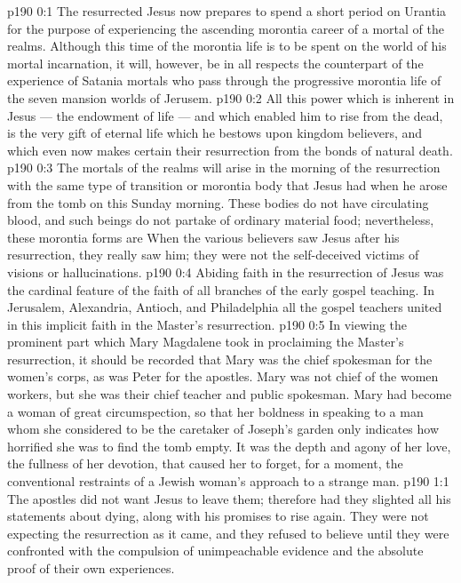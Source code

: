 \author{Midwayer Commission}
\vs p190 0:1 The resurrected Jesus now prepares to spend a short period on Urantia for the purpose of experiencing the ascending morontia career of a mortal of the realms. Although this time of the morontia life is to be spent on the world of his mortal incarnation, it will, however, be in all respects the counterpart of the experience of Satania mortals who pass through the progressive morontia life of the seven mansion worlds of Jerusem.
\vs p190 0:2 All this power which is inherent in Jesus --- the endowment of life --- and which enabled him to rise from the dead, is the very gift of eternal life which he bestows upon kingdom believers, and which even now makes certain their resurrection from the bonds of natural death.
\vs p190 0:3 The mortals of the realms will arise in the morning of the resurrection with the same type of transition or morontia body that Jesus had when he arose from the tomb on this Sunday morning. These bodies do not have circulating blood, and such beings do not partake of ordinary material food; nevertheless, these morontia forms are  When the various believers saw Jesus after his resurrection, they really saw him; they were not the self\hyp{}deceived victims of visions or hallucinations.
\vs p190 0:4 Abiding faith in the resurrection of Jesus was the cardinal feature of the faith of all branches of the early gospel teaching. In Jerusalem, Alexandria, Antioch, and Philadelphia all the gospel teachers united in this implicit faith in the Master’s resurrection.
\vs p190 0:5 \pc In viewing the prominent part which Mary Magdalene took in proclaiming the Master’s resurrection, it should be recorded that Mary was the chief spokesman for the women’s corps, as was Peter for the apostles. Mary was not chief of the women workers, but she was their chief teacher and public spokesman. Mary had become a woman of great circumspection, so that her boldness in speaking to a man whom she considered to be the caretaker of Joseph’s garden only indicates how horrified she was to find the tomb empty. It was the depth and agony of her love, the fullness of her devotion, that caused her to forget, for a moment, the conventional restraints of a Jewish woman’s approach to a strange man.
\vs p190 1:1 The apostles did not want Jesus to leave them; therefore had they slighted all his statements about dying, along with his promises to rise again. They were not expecting the resurrection as it came, and they refused to believe until they were confronted with the compulsion of unimpeachable evidence and the absolute proof of their own experiences.
